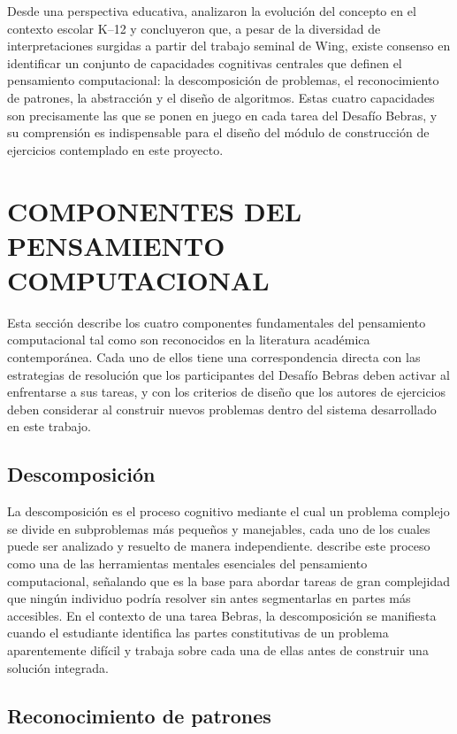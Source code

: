 Desde una perspectiva educativa, \textcite[39]{grover2013} analizaron la evolución del concepto en el contexto escolar K--12 y concluyeron que, a pesar de la diversidad de interpretaciones surgidas a partir del trabajo seminal de Wing, existe consenso en identificar un conjunto de capacidades cognitivas centrales que definen el pensamiento computacional: la descomposición de problemas, el reconocimiento de patrones, la abstracción y el diseño de algoritmos. Estas cuatro capacidades son precisamente las que se ponen en juego en cada tarea del Desafío Bebras, y su comprensión es indispensable para el diseño del módulo de construcción de ejercicios contemplado en este proyecto.

\section{COMPONENTES DEL PENSAMIENTO COMPUTACIONAL}

Esta sección describe los cuatro componentes fundamentales del pensamiento computacional tal como son reconocidos en la literatura académica contemporánea. Cada uno de ellos tiene una correspondencia directa con las estrategias de resolución que los participantes del Desafío Bebras deben activar al enfrentarse a sus tareas, y con los criterios de diseño que los autores de ejercicios deben considerar al construir nuevos problemas dentro del sistema desarrollado en este trabajo.

\subsection{Descomposición}

La descomposición es el proceso cognitivo mediante el cual un problema complejo se divide en subproblemas más pequeños y manejables, cada uno de los cuales puede ser analizado y resuelto de manera independiente. \textcite[34]{wing2006} describe este proceso como una de las herramientas mentales esenciales del pensamiento computacional, señalando que es la base para abordar tareas de gran complejidad que ningún individuo podría resolver sin antes segmentarlas en partes más accesibles. En el contexto de una tarea Bebras, la descomposición se manifiesta cuando el estudiante identifica las partes constitutivas de un problema aparentemente difícil y trabaja sobre cada una de ellas antes de construir una solución integrada.

\subsection{Reconocimiento de patrones}

